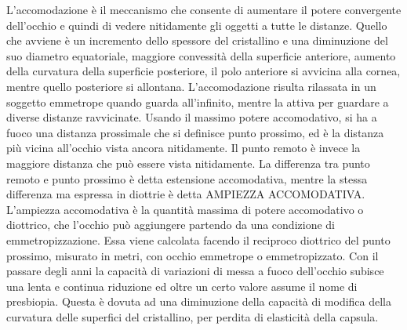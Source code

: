 L’accomodazione è il meccanismo che consente di aumentare il potere convergente dell’occhio e quindi di vedere nitidamente gli oggetti a tutte le distanze. Quello che avviene è un incremento dello spessore del cristallino e una diminuzione del suo diametro equatoriale, maggiore convessità della superficie anteriore, aumento della curvatura della superficie posteriore, il polo anteriore si avvicina alla cornea, mentre quello posteriore si allontana.
L’accomodazione risulta rilassata in un soggetto emmetrope quando guarda all’infinito, mentre la attiva per guardare a diverse distanze ravvicinate. Usando il massimo potere accomodativo, si ha a fuoco una distanza prossimale che si definisce punto prossimo, ed è la distanza più vicina all’occhio vista ancora nitidamente. Il punto remoto è invece la maggiore distanza che può essere vista nitidamente. La differenza tra punto remoto e punto prossimo è detta estensione accomodativa, mentre la stessa differenza ma espressa in diottrie è detta AMPIEZZA ACCOMODATIVA. L’ampiezza accomodativa è la quantità massima di potere accomodativo o diottrico, che l’occhio può aggiungere partendo da una condizione di emmetropizzazione. Essa viene calcolata facendo il reciproco diottrico del punto prossimo, misurato in metri, con occhio emmetrope o emmetropizzato.
Con il passare degli anni la capacità di variazioni di messa a fuoco dell’occhio subisce una lenta e continua riduzione ed oltre un certo valore assume il nome di presbiopia. Questa è dovuta ad una diminuzione della capacità di modifica della curvatura delle superfici del cristallino, per perdita di elasticità della capsula.

